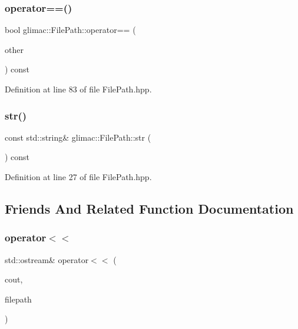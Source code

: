 \subsubsection{\texorpdfstring{operator==()}{operator==()}}
{\footnotesize\ttfamily bool glimac\+::\+File\+Path\+::operator== (\begin{DoxyParamCaption}\item[{const \hyperlink{classglimac_1_1_file_path}{File\+Path} \&}]{other }\end{DoxyParamCaption}) const\hspace{0.3cm}{\ttfamily [inline]}}



Definition at line 83 of file File\+Path.\+hpp.

\mbox{\label{classglimac_1_1_file_path_a620578376a3387535f94ad16ab4839dd}} 
\subsubsection{\texorpdfstring{str()}{str()}}
{\footnotesize\ttfamily const std\+::string\& glimac\+::\+File\+Path\+::str (\begin{DoxyParamCaption}{ }\end{DoxyParamCaption}) const\hspace{0.3cm}{\ttfamily [inline]}}



Definition at line 27 of file File\+Path.\+hpp.



\subsection{Friends And Related Function Documentation}
\mbox{\label{classglimac_1_1_file_path_a924c4e68c4618cf40156646d23ec5f1c}} 
\subsubsection{\texorpdfstring{operator$<$$<$}{operator<<}}
{\footnotesize\ttfamily std\+::ostream\& operator$<$$<$ (\begin{DoxyParamCaption}\item[{std\+::ostream \&}]{cout,  }\item[{const \hyperlink{classglimac_1_1_file_path}{File\+Path} \&}]{filepath }\end{DoxyParamCaption})\hspace{0.3cm}{\ttfamily [friend]}}

